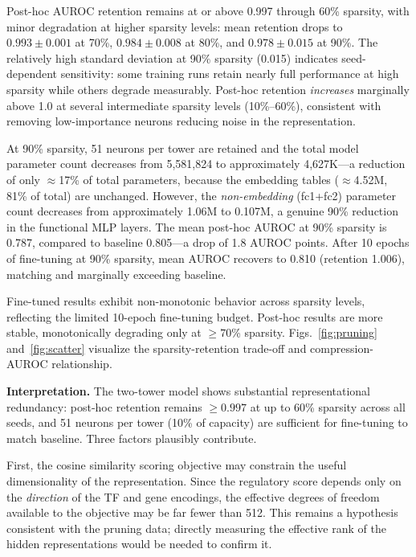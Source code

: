 \documentclass[journal]{IEEEtran}
\begin{document}
Post-hoc AUROC retention remains at or above 0.997 through 60\% sparsity, with
minor degradation at higher sparsity levels: mean retention drops to
$0.993 \pm 0.001$ at 70\%, $0.984 \pm 0.008$ at 80\%, and
$0.978 \pm 0.015$ at 90\%. The relatively high standard deviation at 90\%
sparsity (0.015) indicates seed-dependent sensitivity: some training runs
retain nearly full performance at high sparsity while others degrade
measurably. Post-hoc retention \emph{increases} marginally above 1.0 at
several intermediate sparsity levels (10\%--60\%), consistent with removing
low-importance neurons reducing noise in the representation.

At 90\% sparsity, 51 neurons per tower are retained and the total model
parameter count decreases from 5,581,824 to approximately 4,627K---a
reduction of only $\approx$17\% of total parameters, because the embedding
tables ($\approx$4.52M, 81\% of total) are unchanged. However, the
\emph{non-embedding} (fc1+fc2) parameter count decreases from approximately
1.06M to 0.107M, a genuine 90\% reduction in the functional MLP layers. The mean post-hoc AUROC at 90\%
sparsity is 0.787, compared to baseline 0.805---a drop of 1.8 AUROC points.
After 10 epochs of fine-tuning at 90\% sparsity, mean AUROC recovers to
0.810 (retention 1.006), matching and marginally exceeding baseline.

Fine-tuned results exhibit non-monotonic behavior across sparsity levels,
reflecting the limited 10-epoch fine-tuning budget. Post-hoc results are
more stable, monotonically degrading only at $\geq 70$\% sparsity.
Figs.~\ref{fig:pruning} and~\ref{fig:scatter} visualize the
sparsity-retention trade-off and compression-AUROC relationship.

\textbf{Interpretation.} The two-tower model shows substantial representational
redundancy: post-hoc retention remains $\geq 0.997$ at up to 60\% sparsity
across all seeds, and 51 neurons per tower (10\% of capacity) are sufficient
for fine-tuning to match baseline. Three factors plausibly contribute.

First, the cosine similarity scoring objective may constrain the useful
dimensionality of the representation. Since the regulatory score depends only
on the \emph{direction} of the TF and gene encodings, the effective degrees of
freedom available to the objective may be far fewer than 512. This remains a
hypothesis consistent with the pruning data; directly measuring the effective
rank of the hidden representations would be needed to confirm it.
\end{document}
